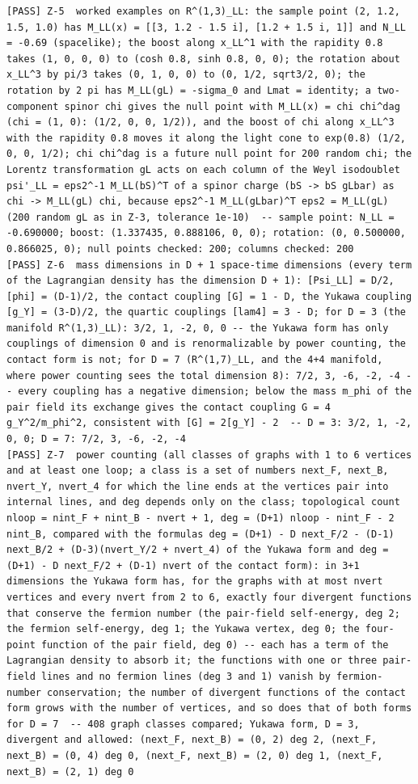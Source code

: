 \documentclass[
  10pt,
]{article}
\begin{document}
\begin{verbatim}
[PASS] Z-5  worked examples on R^(1,3)_LL: the sample point (2, 1.2, 1.5, 1.0) has M_LL(x) = [[3, 1.2 - 1.5 i], [1.2 + 1.5 i, 1]] and N_LL = -0.69 (spacelike); the boost along x_LL^1 with the rapidity 0.8 takes (1, 0, 0, 0) to (cosh 0.8, sinh 0.8, 0, 0); the rotation about x_LL^3 by pi/3 takes (0, 1, 0, 0) to (0, 1/2, sqrt3/2, 0); the rotation by 2 pi has M_LL(gL) = -sigma_0 and Lmat = identity; a two-component spinor chi gives the null point with M_LL(x) = chi chi^dag (chi = (1, 0): (1/2, 0, 0, 1/2)), and the boost of chi along x_LL^3 with the rapidity 0.8 moves it along the light cone to exp(0.8) (1/2, 0, 0, 1/2); chi chi^dag is a future null point for 200 random chi; the Lorentz transformation gL acts on each column of the Weyl isodoublet psi'_LL = eps2^-1 M_LL(bS)^T of a spinor charge (bS -> bS gLbar) as chi -> M_LL(gL) chi, because eps2^-1 M_LL(gLbar)^T eps2 = M_LL(gL) (200 random gL as in Z-3, tolerance 1e-10)  -- sample point: N_LL = -0.690000; boost: (1.337435, 0.888106, 0, 0); rotation: (0, 0.500000, 0.866025, 0); null points checked: 200; columns checked: 200
[PASS] Z-6  mass dimensions in D + 1 space-time dimensions (every term of the Lagrangian density has the dimension D + 1): [Psi_LL] = D/2, [phi] = (D-1)/2, the contact coupling [G] = 1 - D, the Yukawa coupling [g_Y] = (3-D)/2, the quartic couplings [lam4] = 3 - D; for D = 3 (the manifold R^(1,3)_LL): 3/2, 1, -2, 0, 0 -- the Yukawa form has only couplings of dimension 0 and is renormalizable by power counting, the contact form is not; for D = 7 (R^(1,7)_LL, and the 4+4 manifold, where power counting sees the total dimension 8): 7/2, 3, -6, -2, -4 -- every coupling has a negative dimension; below the mass m_phi of the pair field its exchange gives the contact coupling G = 4 g_Y^2/m_phi^2, consistent with [G] = 2[g_Y] - 2  -- D = 3: 3/2, 1, -2, 0, 0; D = 7: 7/2, 3, -6, -2, -4
[PASS] Z-7  power counting (all classes of graphs with 1 to 6 vertices and at least one loop; a class is a set of numbers next_F, next_B, nvert_Y, nvert_4 for which the line ends at the vertices pair into internal lines, and deg depends only on the class; topological count nloop = nint_F + nint_B - nvert + 1, deg = (D+1) nloop - nint_F - 2 nint_B, compared with the formulas deg = (D+1) - D next_F/2 - (D-1) next_B/2 + (D-3)(nvert_Y/2 + nvert_4) of the Yukawa form and deg = (D+1) - D next_F/2 + (D-1) nvert of the contact form): in 3+1 dimensions the Yukawa form has, for the graphs with at most nvert vertices and every nvert from 2 to 6, exactly four divergent functions that conserve the fermion number (the pair-field self-energy, deg 2; the fermion self-energy, deg 1; the Yukawa vertex, deg 0; the four-point function of the pair field, deg 0) -- each has a term of the Lagrangian density to absorb it; the functions with one or three pair-field lines and no fermion lines (deg 3 and 1) vanish by fermion-number conservation; the number of divergent functions of the contact form grows with the number of vertices, and so does that of both forms for D = 7  -- 408 graph classes compared; Yukawa form, D = 3, divergent and allowed: (next_F, next_B) = (0, 2) deg 2, (next_F, next_B) = (0, 4) deg 0, (next_F, next_B) = (2, 0) deg 1, (next_F, next_B) = (2, 1) deg 0

\end{verbatim}
\end{document}
